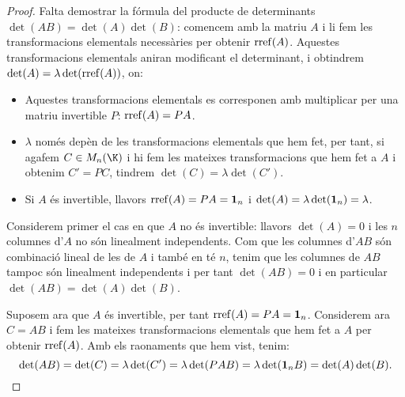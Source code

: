 \begin{proof}
    Falta demostrar la fórmula del producte de determinants $\det(AB)=\det(A)\det(B)$: comencem amb la matriu $A$ i li fem les transformacions elementals necessàries per obtenir $\operatorname{rref}(A)$. Aquestes transformacions elementals aniran modificant el determinant, i obtindrem $\det(A)=\lambda\det(\operatorname{rref}(A))$, on:
    \begin{itemize}
        \item Aquestes transformacions elementals es corresponen amb multiplicar per una matriu invertible $P$: $\operatorname{rref}(A)=PA$.
        \item $\lambda$ només depèn de les transformacions elementals que hem fet, per tant, si agafem $C\in M_n(\K)$ i hi fem les mateixes transformacions que hem fet a $A$ i obtenim $C'=PC$, tindrem $\det(C)=\lambda \det(C')$.
        \item Si $A$ és invertible, llavors $\operatorname{rref}(A)= PA=\mathbf{1}_n$ i $\det(A)=\lambda\det(\mathbf{1}_n)=\lambda$.
    \end{itemize}
    Considerem primer el cas en que $A$ no és invertible: llavors $\det(A)=0$ i les $n$ columnes d'$A$ no són linealment independents. Com que les columnes d'$AB$ són combinació lineal de les de $A$ i també en té $n$, tenim que les columnes de $AB$ tampoc són linealment independents i per tant $\det(AB)=0$ i en particular $\det(AB)=\det(A)\det(B)$.
    
    Suposem ara que $A$ és invertible, per tant $\operatorname{rref}(A)=PA=\mathbf{1}_n$. Considerem ara $C=AB$ i fem les mateixes transformacions elementals que hem fet a $A$ per obtenir $\operatorname{rref}(A)$. Amb els raonaments que hem vist, tenim:
    $$
    \det(AB)=\det(C)=\lambda \det(C')=\lambda \det(PAB)=\lambda \det(\mathbf{1}_n B)=\det(A)\det(B).
    $$
\end{proof}


